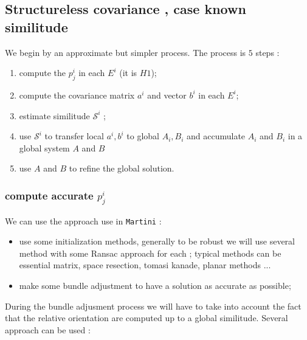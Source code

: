 
\subsection{Structureless covariance , case known similitude}

We begin by an approximate but simpler process. The process is $5$ steps :

\begin{enumerate}
    \item compute the  $p^i_j$ in each $E^i$  (it is $H1$);
    \item compute the  covariance matrix $a^i$ and  vector $b^i$  in each $E^i$;
    \item estimate similitude $\mathcal{S}^i$  ;
    \item use $\mathcal{S}^i$ to transfer local $a^i,b^i$ to global $A_i,B_i$ and accumulate  
          $A_i$ and $B_i$ in a global system $A$ and $B$
    \item use $A$ and $B$ to refine the global solution.
\end{enumerate}


\subsubsection{compute accurate  $p^i_j$ }

We can use the approach use in {\tt Martini} :

\begin{itemize}
    \item use some  initialization methods, generally to be robust we will use
          several method with some Ransac approach for each ; typical methods can be 
          essential matrix, space resection, tomasi kanade, planar methods ...

    \item make some bundle adjustment to have a solution as accurate as possible;
\end{itemize}

During the bundle adjusment process we will have to take into account the fact that the
relative orientation are computed up to a global similitude. Several approach can be used :

